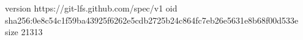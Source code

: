 version https://git-lfs.github.com/spec/v1
oid sha256:0e8c54c1f59ba43925f6262e5cdb2725b24c864fc7eb26e5631e8b68f00d533e
size 21313
